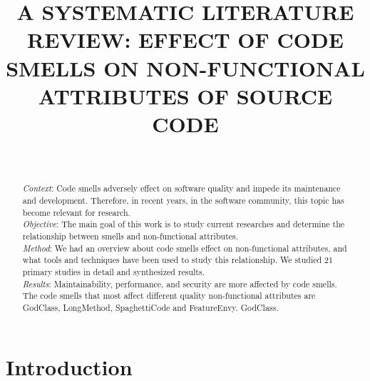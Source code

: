 \documentclass{sigchi}
\def\plaintitle{A SYSTEMATIC LITERATURE REVIEW: EFFECT OF CODE SMELLS ON NON-FUNCTIONAL ATTRIBUTES OF SOURCE CODE}
\begin{document}
\title{\plaintitle}

\author{%
  \\

}

\maketitle

\begin{abstract}
  \textit{Context}: Code smells adversely effect on software quality and impede its maintenance and development. Therefore, in recent years, in the software community, this topic has become relevant for research. \\
  \textit{Objective}: The main goal of this work is to study current researches and determine the relationship between smells and non-functional attributes.\\
  \textit{Method}: We had an overview about code smells effect on non-functional attributes, and what tools and techniques have been used to study this relationship. We studied 21 primary studies in detail and synthesized results.\\ 
  \textit{Results}: Maintainability, performance, and security are more affected by code smells. The code smells that most affect different quality non-functional attributes are GodClass, LongMethod, SpaghettiCode and FeatureEnvy. GodClass. 
  
  
\end{abstract}


\section{Introduction}
\end{document}
